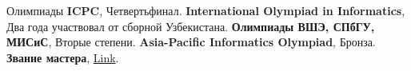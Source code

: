 \begin{rubric}{Олимпиады}
\entry*[2019] \textbf{ICPC}, Четвертьфинал.
%
\entry*[2018 -- 2019] \textbf{International Olympiad in Informatics}, Два года участвовал от сборной Узбекистана.
%
\entry*[2019] \textbf{Олимпиады ВШЭ, СПбГУ, МИСиС}, Вторые степени.
%
\entry*[2019] \textbf{Asia-Pacific Informatics Olympiad}, Бронза.
%
\entry*[Codeforces] \textbf{Звание мастера}, \href{https://codeforces.com/profile/MetaPostRocker}{Link}.

\end{rubric}